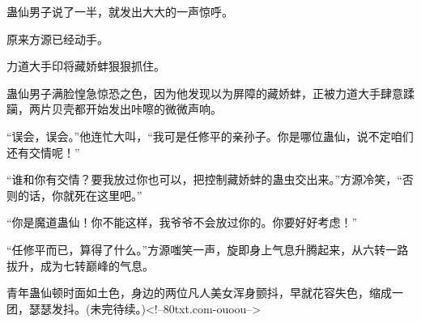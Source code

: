 \begin{this_body}
蛊仙男子说了一半，就发出大大的一声惊呼。

原来方源已经动手。

力道大手印将藏娇蚌狠狠抓住。

蛊仙男子满脸惶急惊恐之色，因为他发现以为屏障的藏娇蚌，正被力道大手肆意蹂躏，两片贝壳都开始发出咔嚓的微微声响。

“误会，误会。”他连忙大叫，“我可是任修平的亲孙子。你是哪位蛊仙，说不定咱们还有交情呢！”

“谁和你有交情？要我放过你也可以，把控制藏娇蚌的蛊虫交出来。”方源冷笑，“否则的话，你就死在这里吧。”

“你是魔道蛊仙！你不能这样，我爷爷不会放过你的。你要好好考虑！”

“任修平而已，算得了什么。”方源嗤笑一声，旋即身上气息升腾起来，从六转一路拔升，成为七转巅峰的气息。

青年蛊仙顿时面如土色，身边的两位凡人美女浑身颤抖，早就花容失色，缩成一团，瑟瑟发抖。(未完待续。)<!--80txt.com-ouoou-->

\end{this_body}

